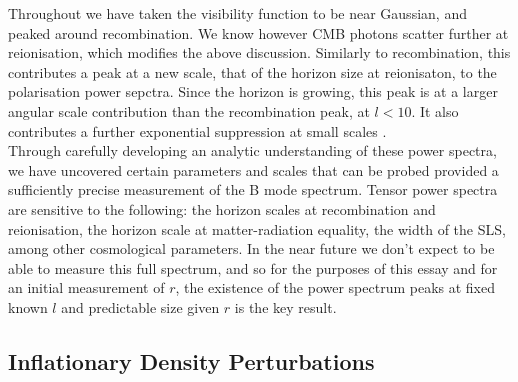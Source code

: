 \documentclass[a4paper,10pt]{article}
\begin{document}
Throughout we have taken the visibility function to be near Gaussian, and peaked around recombination. We know however CMB photons scatter further at reionisation, which modifies the above discussion. Similarly to recombination, this contributes a peak at a new scale, that of the horizon size at reionisaton, to the polarisation power sepctra. Since the horizon is growing, this peak is at a larger angular scale contribution than the recombination peak, at $l<10$. It also contributes a further exponential suppression at small scales \cite{reionisation2}.\\

Through carefully developing an analytic understanding of these power spectra, we have uncovered certain parameters and scales that can be probed provided a sufficiently precise measurement of the B mode spectrum. Tensor power spectra are sensitive to the following: the horizon scales at recombination and reionisation, the horizon scale at matter-radiation equality, the width of the SLS, among other cosmological parameters. In the near future we don't expect to be able to measure this full spectrum, and so for the purposes of this essay and for an initial measurement of $r$, the existence of the power spectrum peaks at fixed known $l$ and predictable size given $r$ is the key result.



\subsection{Inflationary Density Perturbations}
\end{document}
